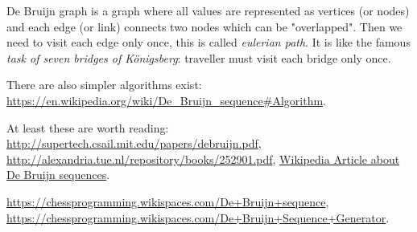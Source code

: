 De Bruijn graph is a graph where all values are represented as vertices (or nodes) and each edge (or link) connects two nodes which can be "overlapped".
Then we need to visit each edge only once, this is called \textit{eulerian path}.
It is like the famous \textit{task of seven bridges of Königsberg}:
traveller must visit each bridge only once.

There are also simpler algorithms exist: \url{https://en.wikipedia.org/wiki/De_Bruijn_sequence\#Algorithm}.


At least these are worth reading:
\url{http://supertech.csail.mit.edu/papers/debruijn.pdf},
\url{http://alexandria.tue.nl/repository/books/252901.pdf},
\href{https://en.wikipedia.org/wiki/De_Bruijn_sequence}{Wikipedia Article about De Bruijn sequences}.

\url{https://chessprogramming.wikispaces.com/De+Bruijn+sequence},
\url{https://chessprogramming.wikispaces.com/De+Bruijn+Sequence+Generator}.

\levelup{}

